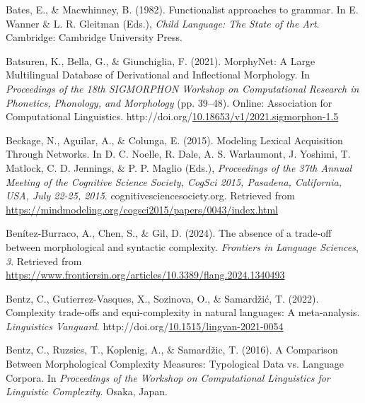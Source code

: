 \documentclass[10pt, letterpaper]{article}
\begin{document}
\label{refs}
\begin{CSLReferences}{1}{0}
Bates, E., \& Macwhinney, B. (1982). Functionalist approaches to
grammar. In E. Wanner \& L. R. Gleitman (Eds.), \emph{Child {Language}:
{The State} of the {Art}}. {Cambridge}: {Cambridge University Press}.

Batsuren, K., Bella, G., \& Giunchiglia, F. (2021). {MorphyNet}: A
{Large Multilingual Database} of {Derivational} and {Inflectional
Morphology}. In \emph{Proceedings of the 18th {SIGMORPHON Workshop} on
{Computational Research} in {Phonetics}, {Phonology}, and {Morphology}}
(pp. 39--48). {Online}: {Association for Computational Linguistics}.
http://doi.org/\href{https://doi.org/10.18653/v1/2021.sigmorphon-1.5}{10.18653/v1/2021.sigmorphon-1.5}

Beckage, N., Aguilar, A., \& Colunga, E. (2015). Modeling {Lexical
Acquisition Through Networks}. In D. C. Noelle, R. Dale, A. S.
Warlaumont, J. Yoshimi, T. Matlock, C. D. Jennings, \& P. P. Maglio
(Eds.), \emph{Proceedings of the 37th {Annual Meeting} of the {Cognitive
Science Society}, {CogSci} 2015, {Pasadena}, {California}, {USA}, {July}
22-25, 2015}. cognitivesciencesociety.org. Retrieved from
\url{https://mindmodeling.org/cogsci2015/papers/0043/index.html}

Benítez-Burraco, A., Chen, S., \& Gil, D. (2024). The absence of a
trade-off between morphological and syntactic complexity.
\emph{Frontiers in Language Sciences}, \emph{3}. Retrieved from
\url{https://www.frontiersin.org/articles/10.3389/flang.2024.1340493}

Bentz, C., Gutierrez-Vasques, X., Sozinova, O., \& Samardžić, T. (2022).
Complexity trade-offs and equi-complexity in natural languages: A
meta-analysis. \emph{Linguistics Vanguard}.
http://doi.org/\href{https://doi.org/10.1515/lingvan-2021-0054}{10.1515/lingvan-2021-0054}

Bentz, C., Ruzsics, T., Koplenig, A., \& Samardžic, T. (2016). A
{Comparison Between Morphological Complexity Measures}: {Typological
Data} vs. {Language Corpora}. In \emph{Proceedings of the {Workshop} on
{Computational Linguistics} for {Linguistic Complexity}}. {Osaka,
Japan}.


\end{CSLReferences}
\end{document}
